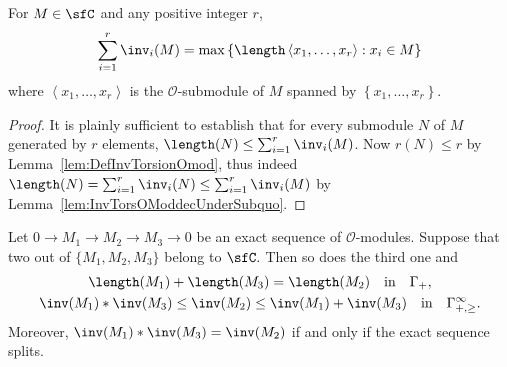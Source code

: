 \begin{lemm}\label{lem:InvTorsOMod_Formula}
For $M\in\sfC$ and any positive integer $r$,
\[
\sum_{i=1}^{r}\inv_{i}(M)=\max\left\{ \length\left\langle x_{1},\dots,x_{r}\right\rangle :x_{i}\in M\right\}
\]
where $\left\langle x_{1},\dots,x_{r}\right\rangle $ is the $\mathcal{O}$-submodule of $M$ spanned by $\left\{ x_{1},\dots,x_{r}\right\} $.
\end{lemm}
\begin{proof}
It is plainly sufficient to establish that for every submodule $N$ of $M$ generated by $r$ elements, $\length(N)\leq\sum_{i=1}^{r}\inv_{i}(M)$. Now $r(N)\leq r$ by Lemma~\ref{lem:DefInvTorsionOmod}, thus indeed $\length(N)=\sum_{i=1}^{r}\inv_{i}(N)\leq\sum_{i=1}^{r}\inv_{i}(M)$ by Lemma~\ref{lem:InvTorsOModdecUnderSubquo}.
\end{proof}

\begin{lemm}\label{lem:InvTorsOModAndExactSeq}
Let $0\rightarrow M_{1}\rightarrow M_{2}\rightarrow M_{3}\rightarrow0$ be an exact sequence of $\mathcal{O}$-modules. Suppose that two out of $\{M_{1},M_{2},M_{3}\}$ belong to $\sfC.$ Then so does the third one and
\begin{gather*}
\length(M_{1})+\length(M_{3})=\length(M_{2})\quad\text{in}\quad\Gamma_{+},\\
\inv(M_{1})\ast\inv(M_{3})\leq\inv(M_{2})\le\inv(M_{1})+\inv(M_{3})\quad\text{in}\quad\Gamma_{+,\geq}^{\infty}.
\end{gather*}
Moreover, $\inv(M_{1})\ast\inv(M_{3})=\inv(M_{2})$ if and only if the exact sequence splits.
\end{lemm}

